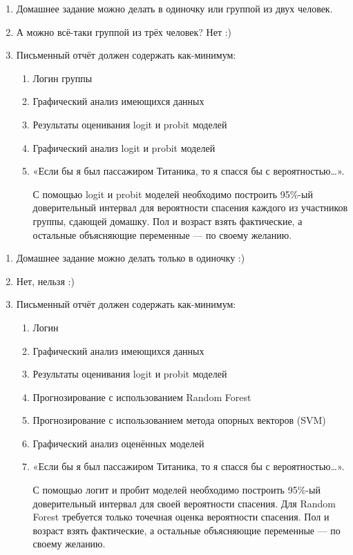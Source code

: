 \documentclass[12pt, a4paper]{article}
\begin{document}
\begin{enumerate}
\item Домашнее задание можно делать в одиночку или группой из двух человек.
\item А можно всё-таки группой из трёх человек? Нет :)
\item Письменный отчёт  должен содержать как-минимум:
\begin{enumerate}
\item Логин группы
\item Графический анализ имеющихся данных
\item Результаты оценивания logit и probit моделей
\item Графический анализ logit и probit моделей
\item «Если бы я был пассажиром Титаника, то я спасся бы с вероятностью\ldots».

С помощью logit и probit моделей необходимо построить 95\%-ый доверительный интервал для вероятности спасения каждого из участников группы, сдающей домашку. Пол и возраст взять фактические, а остальные объясняющие переменные — по своему желанию.
\end{enumerate}
\end{enumerate}


\vspace{15pt}
\RedRoseLine
\vspace{15pt}


\begin{enumerate}
\item Домашнее задание можно делать только в одиночку :)
\item Нет, нельзя :)
\item Письменный отчёт  должен содержать как-минимум:
\begin{enumerate}
\item Логин
\item Графический анализ имеющихся данных
\item Результаты оценивания logit и probit моделей
\item Прогнозирование с использованием Random Forest
\item Прогнозирование с использованием метода опорных векторов (SVM)
\item Графический анализ оценённых моделей
\item «Если бы я был пассажиром Титаника, то я спасся бы с вероятностью\ldots».

С помощью логит и пробит моделей необходимо построить 95\%-ый доверительный интервал для своей вероятности спасения. Для Random Forest требуется только точечная оценка вероятности спасения. Пол и возраст взять фактические, а остальные объясняющие переменные — по своему желанию.
\end{enumerate}
\end{enumerate}
\end{document}
